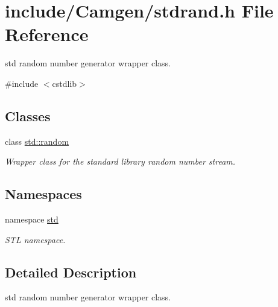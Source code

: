 \hypertarget{a00600}{
\section{include/Camgen/stdrand.h File Reference}
\label{a00600}
}


std random number generator wrapper class.  


{\ttfamily \#include $<$cstdlib$>$}\par
\subsection*{Classes}
\begin{DoxyCompactItemize}
\item 
class \hyperlink{a00421}{std::random}
\begin{DoxyCompactList}\small\item\em Wrapper class for the standard library random number stream. \end{DoxyCompactList}\end{DoxyCompactItemize}
\subsection*{Namespaces}
\begin{DoxyCompactItemize}
\item 
namespace \hyperlink{a00804}{std}


\begin{DoxyCompactList}\small\item\em STL namespace. \end{DoxyCompactList}

\end{DoxyCompactItemize}


\subsection{Detailed Description}
std random number generator wrapper class. 